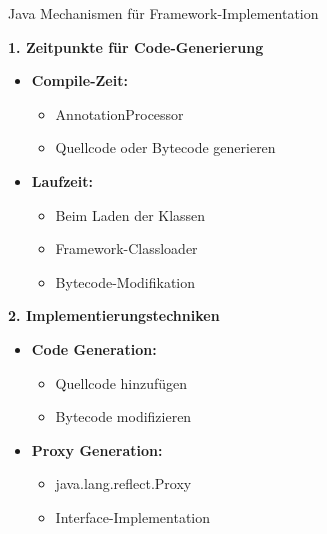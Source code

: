\begin{KR}{Java Mechanismen für Framework-Implementation}

    \begin{minipage}[t]{0.55\textwidth}
\textbf{1. Zeitpunkte für Code-Generierung}
\begin{itemize}
    \item \textbf{Compile-Zeit:}
    \begin{itemize}
        \item AnnotationProcessor
        \item Quellcode oder Bytecode generieren
    \end{itemize}
    \item \textbf{Laufzeit:}
    \begin{itemize}
        \item Beim Laden der Klassen
        \item Framework-Classloader
        \item Bytecode-Modifikation
    \end{itemize}
\end{itemize}
\end{minipage}
\begin{minipage}[t]{0.45\textwidth}
\textbf{2. Implementierungstechniken}
\begin{itemize}
    \item \textbf{Code Generation:}
    \begin{itemize}
        \item Quellcode hinzufügen
        \item Bytecode modifizieren
    \end{itemize}
    \item \textbf{Proxy Generation:}
    \begin{itemize}
        \item java.lang.reflect.Proxy
        \item Interface-Implementation
    \end{itemize}
\end{itemize}
\end{minipage}
\end{KR}



